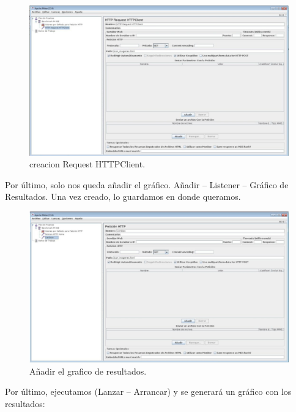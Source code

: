 \begin{figure}[H]
\begin{center}
\includegraphics[scale=0.3]{imagenes/imagen4-4.eps}
\caption{creacion Request HTTPClient.}
\end{center}
\end{figure}
Por último, solo nos queda añadir el gráfico. Añadir -- Listener -- Gráfico de Resultados. Una vez creado, lo guardamos en donde queramos.
\begin{figure}[H]
\begin{center}
\includegraphics[scale=0.3]{imagenes/imagen4-5.eps}
\caption{Añadir el grafico de resultados.}
\end{center}
\end{figure}
Por último, ejecutamos (Lanzar -- Arrancar) y se generará un gráfico con los resultados:
